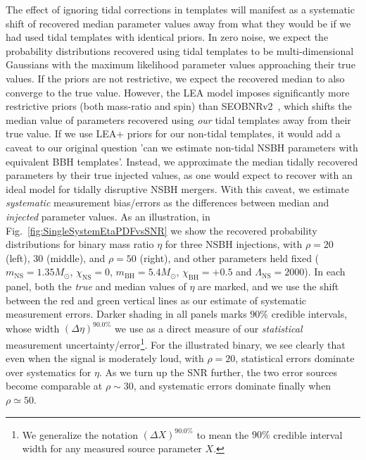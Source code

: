 \documentclass[aps,prd,amsmath,floats,floatfix, twocolumn,
superscriptaddress,nofootinbib,showpacs]{revtex4-1}
\newcommand{\lambdans}{\Lambda_\mathrm{NS}}
\newcommand{\chibh}{\chi_\mathrm{BH}}
\newcommand{\chins}{\chi_\mathrm{NS}}
\newcommand{\mbh}{m_\mathrm{BH}}
\newcommand{\mns}{m_\mathrm{NS}}
\begin{document}
The effect of ignoring
tidal corrections in templates will manifest as a systematic shift
of recovered median parameter values away from what they would be if we had used
tidal templates with identical priors. 
In zero noise, we expect the probability distributions recovered using tidal
templates to be multi-dimensional Gaussians with the maximum likelihood
parameter values approaching their true values. If the priors are not
restrictive, we expect the recovered median to also converge to the true value.
However,
the LEA model imposes significantly more restrictive priors (both mass-ratio
and spin) than SEOBNRv2~\cite{Taracchini:2013rva,Lackey:2013axa}, which shifts
the median value of parameters recovered using {\it our} tidal templates away
from their true value. If we use LEA+ priors for our non-tidal templates, it
would add a caveat to our original question 'can we estimate non-tidal NSBH
parameters with equivalent BBH templates'. Instead, we approximate the median
tidally recovered parameters by their true injected values, as one would expect
to recover with an ideal model for tidally disruptive NSBH mergers. With this
caveat, we estimate {\it systematic} measurement bias/errors as the
differences between median and {\it injected} parameter values. 
% 
As an illustration, in Fig.~\ref{fig:SingleSystemEtaPDFvsSNR} we show the
recovered probability distributions for binary mass ratio $\eta$ for
three NSBH injections, with $\rho=20$ (left), $30$ (middle), and $\rho=50$
(right), and other parameters held fixed ($\mns=1.35M_\odot$, $\chins=0$,
$\mbh=5.4M_\odot$, $\chibh=+0.5$ and $\lambdans=2000$). In each panel, both
the {\it true} and median values of $\eta$ are marked, and we use
the shift between the red and green vertical lines as our estimate of systematic
measurement errors. Darker shading in all panels marks $90\%$ credible intervals,
whose width $(\Delta\eta)^{90.0\%}$ we use as a direct measure of our
{\it statistical} measurement uncertainty/error\footnote{We generalize the
notation $(\Delta X)^{90.0\%}$ to mean the $90\%$ credible interval width
for any measured source parameter $X$.}.
% 
For the illustrated binary,
we see clearly that even when the signal is moderately loud, with $\rho=20$,
statistical errors dominate over systematics for $\eta$. As we turn up the SNR
further, the two error sources become comparable at $\rho\sim 30$,
and systematic errors dominate finally when $\rho\simeq 50$.
\end{document}

